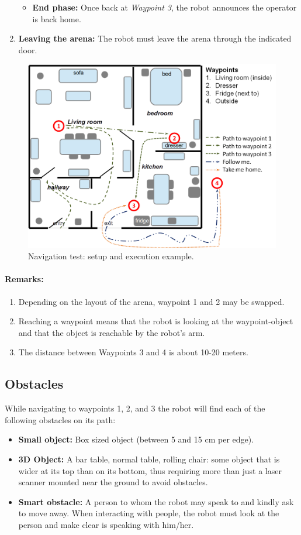 \begin{enumerate}
\begin{itemize}
		\item \textbf{End phase:} Once back at \textit{Waypoint 3}, the robot announces the operator is back home. 
	\end{itemize}
	
	\item \textbf{Leaving the arena:} The robot must leave the arena through the indicated door.
\end{enumerate}

\begin{figure}[tbp]
	\centering
	\includegraphics[width=0.5\columnwidth]{images/navigation.png}
	\caption{Navigation test: setup and execution example.}
	\label{fig:restaurant}
\end{figure}

\paragraph*{Remarks:}
\begin{enumerate}
	\item Depending on the layout of the arena, waypoint 1 and 2 may be swapped.
	\item Reaching a waypoint means that the robot is looking at the waypoint-object and that the object is reachable by the robot's arm.
	\item The distance between Waypoints 3 and 4 is about 10-20 meters.
\end{enumerate}

\subsection{Obstacles}
While navigating to waypoints 1, 2, and 3 the robot will find each of the following obstacles on its path:
\begin{itemize}
		\item \textbf{Small object:} Box sized object (between 5 and 15 cm per edge).  
		\item \textbf{3D Object:} A bar table, normal table, rolling chair: some object that is wider at its top than on its bottom, 
		  thus requiring more than just a laser scanner mounted near the ground to avoid obstacles.
		\item \textbf{Smart obstacle:} A person to whom the robot may speak to and kindly ask to move away. When interacting with people, the robot must look at the person and make clear is speaking with him/her.
	\end{itemize}


